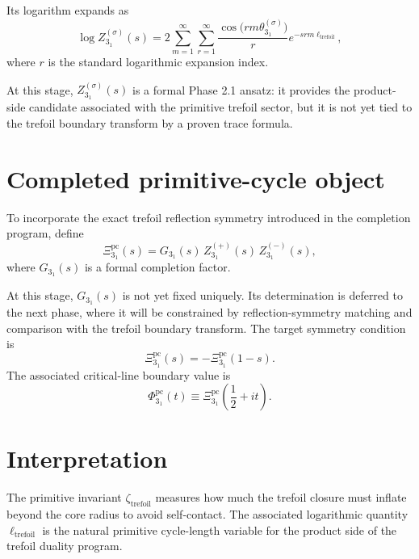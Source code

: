 \documentclass[11pt]{article}
\newcommand{\zetatrefoil}{\zeta_{\mathrm{trefoil}}}
\newcommand{\elltrefoil}{\ell_{\mathrm{trefoil}}}
\begin{document}
Its logarithm expands as
\begin{equation}
    \log Z_{3_1}^{(\sigma)}(s)
    =
    2\sum_{m=1}^{\infty}\sum_{r=1}^{\infty}
    \frac{\cos\!\big(rm\theta_{3_1}^{(\sigma)}\big)}{r}
    e^{-srm\elltrefoil},
    \label{eq:primitive-zeta-log}
\end{equation}
where \(r\) is the standard logarithmic expansion index.

At this stage, \(Z_{3_1}^{(\sigma)}(s)\) is a formal Phase 2.1 ansatz: it provides the product-side candidate associated with the primitive trefoil sector, but it is not yet tied to the trefoil boundary transform by a proven trace formula.

\section{Completed primitive-cycle object}

To incorporate the exact trefoil reflection symmetry introduced in the completion program, define
\begin{equation}
    \Xi_{3_1}^{\mathrm{pc}}(s)
    =
    G_{3_1}(s)\,
    Z_{3_1}^{(+)}(s)\,
    Z_{3_1}^{(-)}(s),
    \label{eq:completed-primitive}
\end{equation}
where \(G_{3_1}(s)\) is a formal completion factor.

At this stage, \(G_{3_1}(s)\) is not yet fixed uniquely. Its determination is deferred to the next phase, where it will be constrained by reflection-symmetry matching and comparison with the trefoil boundary transform. The target symmetry condition is
\begin{equation}
    \Xi_{3_1}^{\mathrm{pc}}(s)=-\Xi_{3_1}^{\mathrm{pc}}(1-s).
    \label{eq:completed-reflection}
\end{equation}
The associated critical-line boundary value is
\begin{equation}
    \Phi_{3_1}^{\mathrm{pc}}(t)
    \equiv
    \Xi_{3_1}^{\mathrm{pc}}\!\left(\frac12+it\right).
\end{equation}

\section{Interpretation}

The primitive invariant \(\zetatrefoil\) measures how much the trefoil closure must inflate beyond the core radius to avoid self-contact. The associated logarithmic quantity \(\elltrefoil\) is the natural primitive cycle-length variable for the product side of the trefoil duality program.
\end{document}
